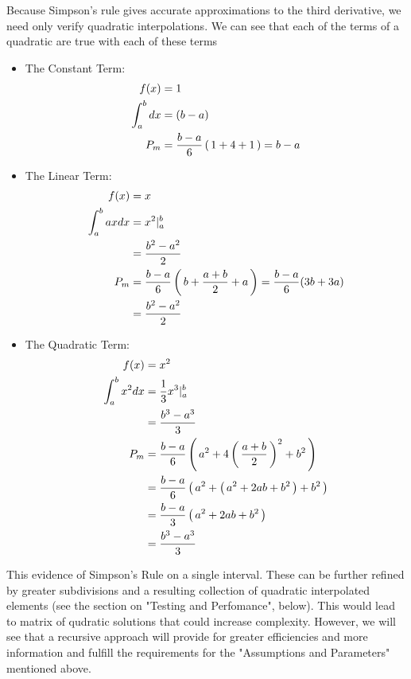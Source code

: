 \documentclass[12pt,a4paper]{report}
\begin{document}

Because Simpson's rule gives accurate approximations to the third derivative, we need only verify quadratic interpolations.  We can see that each of the terms of a quadratic are true with each of these terms
\begin{itemize}
	\item The Constant Term:
	\begin{align*}
		f(x) &= 1\\
		\int_a^b dx &= (b-a)\\
		P_m &=  \frac{b-a}{6} \left (\, 1+4+1 \,\right ) = b-a
	\end{align*}
	\item The Linear Term:
	\begin{align*}
		f(x) &= x \\
		\int_a^b ax dx &= x^2|_a^b \\
		&= \frac{b^2-a^2}{2} \\
		P_m &= \frac{b-a}{6} \left (\, b+\frac{a+b}{2}+a \,\right ) = \frac{b-a}{6} (3b+3a) \\
		&= \frac{b^2-a^2}{2}
	\end{align*}
	\item The Quadratic Term:
	\begin{align*}
		f(x) &= x^2\\
		\int_a^b x^2 dx &= \frac{1}{3}x^3 |_a^b\\
		&= \frac{b^3-a^3}{3}\\
		P_m &= \frac{b-a}{6}\left (\, a^2+4\left (\, \frac{a+b}{2} \,\right )^2 + b^2 \,\right )\\
		&= \frac{b-a}{6}\left (\, a^2+\left (\, a^2+2ab+b^2 \,\right ) + b^2 \,\right )\\
		&= \frac{b-a}{3}\left (\, a^2+2ab+b^2 \,\right ) \\
		&= \frac{b^3-a^3}{3}
	\end{align*}
\end{itemize}

This evidence of Simpson's Rule on a single interval.  These can be further refined by greater subdivisions and a resulting collection of quadratic interpolated elements (see the section on "Testing and Perfomance", below).  This would lead to matrix of qudratic solutions that could increase complexity.   However, we will see that a recursive approach will provide for greater efficiencies and more information and fulfill the requirements for the "Assumptions and Parameters" mentioned above. \\
\end{document}
